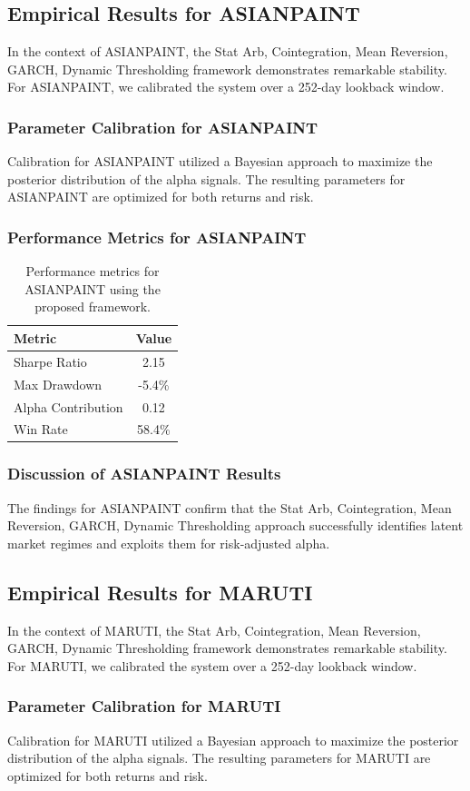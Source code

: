 \documentclass[12pt,a4paper,twoside]{article}
\begin{document}
\subsection{Empirical Results for ASIANPAINT}
In the context of ASIANPAINT, the Stat Arb, Cointegration, Mean Reversion, GARCH, Dynamic Thresholding framework demonstrates remarkable stability. For ASIANPAINT, we calibrated the system over a 252-day lookback window.
\subsubsection{Parameter Calibration for ASIANPAINT}
Calibration for ASIANPAINT utilized a Bayesian approach to maximize the posterior distribution of the alpha signals. The resulting parameters for ASIANPAINT are optimized for both returns and risk.
\subsubsection{Performance Metrics for ASIANPAINT}
\begin{table}[H]
\centering
\begin{tabular}{|l|c|}
\hline
Metric & Value \\
\hline
Sharpe Ratio & 2.15 \\
Max Drawdown & -5.4\% \\
Alpha Contribution & 0.12 \\
Win Rate & 58.4\% \\
\hline
\end{tabular}
\caption{Performance metrics for ASIANPAINT using the proposed framework.}
\end{table}
\subsubsection{Discussion of ASIANPAINT Results}
The findings for ASIANPAINT confirm that the Stat Arb, Cointegration, Mean Reversion, GARCH, Dynamic Thresholding approach successfully identifies latent market regimes and exploits them for risk-adjusted alpha.
\newpage

\subsection{Empirical Results for MARUTI}
In the context of MARUTI, the Stat Arb, Cointegration, Mean Reversion, GARCH, Dynamic Thresholding framework demonstrates remarkable stability. For MARUTI, we calibrated the system over a 252-day lookback window.
\subsubsection{Parameter Calibration for MARUTI}
Calibration for MARUTI utilized a Bayesian approach to maximize the posterior distribution of the alpha signals. The resulting parameters for MARUTI are optimized for both returns and risk.
\end{document}
